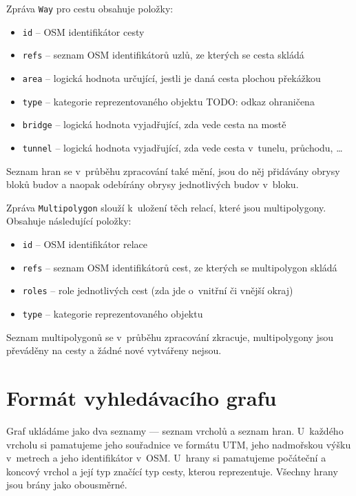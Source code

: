 Zpráva \verb|Way| pro cestu obsahuje položky:
\begin{itemize}
	\item \verb|id| -- OSM identifikátor cesty
	\item \verb|refs| -- seznam OSM identifikátorů uzlů, ze kterých se cesta
	skládá
	\item \verb|area| -- logická hodnota určující, jestli je daná cesta
	plochou
	překážkou
	\item \verb|type| -- kategorie reprezentovaného objektu TODO: odkaz
	ohraničena
	\item \verb|bridge| -- logická hodnota vyjadřující, zda vede cesta na mostě
	\item \verb|tunnel| -- logická hodnota vyjadřující, zda vede cesta
v~tunelu, průchodu, \dots
\end{itemize}
Seznam hran se v~průběhu zpracování také mění, jsou do něj přidávány obrysy
bloků budov a naopak odebírány obrysy jednotlivých budov v~bloku.

Zpráva \verb|Multipolygon| slouží k~uložení těch relací, které jsou
multipolygony. Obsahuje následující položky:
\begin{itemize}
	\item \verb|id| -- OSM identifikátor relace
	\item \verb|refs| -- seznam OSM identifikátorů cest, ze kterých se
	multipolygon skládá
	\item \verb|roles| -- role jednotlivých cest (zda jde o~vnitřní či vnější
	okraj)
	\item \verb|type| -- kategorie reprezentovaného objektu
\end{itemize}
Seznam multipolygonů se v~průběhu zpracování zkracuje, multipolygony jsou
převáděny na cesty a žádné nové vytvářeny nejsou.



\section{Formát vyhledávacího grafu}
Graf ukládáme jako dva seznamy --- seznam vrcholů a seznam hran. U~každého
vrcholu si pamatujeme jeho souřadnice ve formátu UTM, jeho nadmořskou výšku
v~metrech a jeho identifikátor v~OSM. U~hrany si pamatujeme počáteční a koncový
vrchol a její typ značící typ cesty, kterou reprezentuje. Všechny hrany jsou
brány jako obousměrné.

